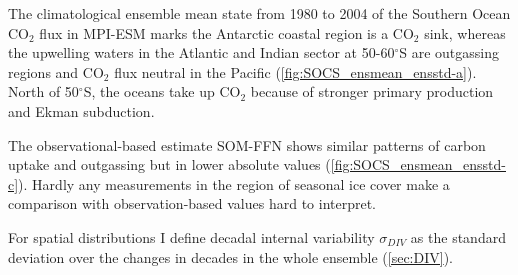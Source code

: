 The climatological ensemble mean state from 1980 to 2004 of the Southern Ocean CO$_2$ flux in \acs{MPI-ESM} marks the Antarctic coastal region is a CO$_2$ sink, whereas the upwelling waters in the Atlantic and Indian sector at 50-60$^\circ$S are outgassing regions and CO$_2$ flux neutral in the Pacific (\autoref{fig:SOCS_ensmean_ensstd-a}). North of 50$^\circ$S, the oceans take up CO$_2$ because of stronger primary production and Ekman subduction.\newline

 
The observational-based estimate \acs{SOM-FFN} shows similar patterns of carbon uptake and outgassing but in lower absolute values (\autoref{fig:SOCS_ensmean_ensstd-c}). 
Hardly any measurements in the region of seasonal ice cover make a comparison with observation-based values hard to interpret.\newline

For spatial distributions I define decadal internal variability $\sigma_{DIV}$ as the standard deviation over the changes in decades in the whole ensemble (\autoref{sec:DIV}).


